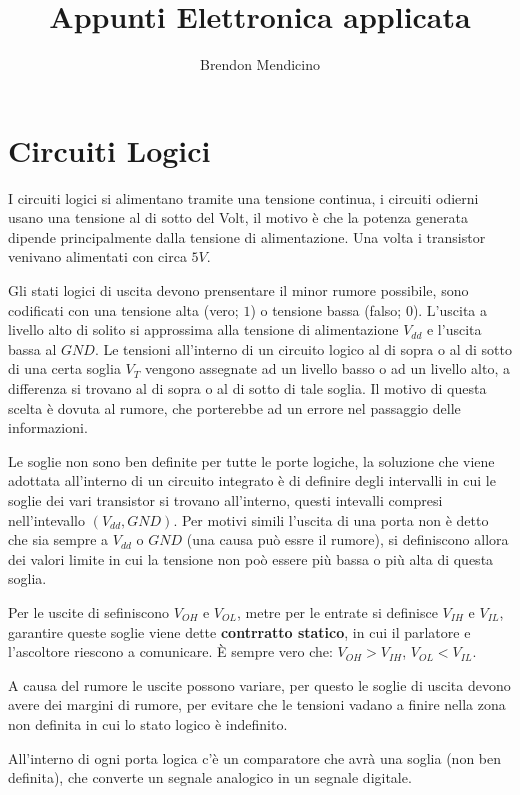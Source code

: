 \documentclass[12pt]{article}
\title{Appunti Elettronica applicata}
\author{Brendon Mendicino}
\begin{document}
\maketitle
\tableofcontents


\newpage
\section{Circuiti Logici}
I circuiti logici si alimentano tramite una tensione continua, i circuiti odierni usano una tensione al di sotto del Volt, il motivo \`e che la potenza generata dipende principalmente dalla tensione di alimentazione. Una volta i transistor venivano alimentati con circa $5V$.

Gli stati logici di uscita devono prensentare il minor rumore possibile, sono codificati con una tensione alta (vero; $1$) o tensione bassa (falso; $0$). L'uscita a livello alto di solito si approssima alla tensione di alimentazione $V_{dd}$ e l'uscita bassa al $GND$. Le tensioni all'interno di un circuito logico al di sopra o al di sotto di una certa soglia $V_T$ vengono assegnate ad un livello basso o ad un livello alto, a differenza si trovano al di sopra o al di sotto di tale soglia. Il motivo di questa scelta \`e dovuta al rumore, che porterebbe ad un errore nel passaggio delle informazioni.

Le soglie non sono ben definite per tutte le porte logiche, la soluzione che viene adottata all'interno di un circuito integrato \`e di definire degli intervalli in cui le soglie dei vari transistor si trovano all'interno, questi intevalli compresi nell'intevallo $(V_{dd}, GND)$. Per motivi simili l'uscita di una porta non \`e detto che sia sempre a $V_{dd}$ o $GND$ (una causa pu\`o essre il rumore), si definiscono allora dei valori limite in cui la tensione non po\`o essere pi\`u bassa o pi\`u alta di questa soglia.

Per le uscite di sefiniscono $V_{OH}$ e $V_{OL}$, metre per le entrate si definisce $V_{IH}$ e $V_{IL}$, garantire queste soglie viene dette \textbf{contrratto statico}, in cui il parlatore e l'ascoltore riescono a comunicare. \`E sempre vero che: $V_{OH} > V_{IH}$, $V_{OL} < V_{IL}$.
 
A causa del rumore le uscite possono variare, per questo le soglie di uscita devono avere dei margini di rumore, per evitare che le tensioni vadano a finire nella zona non definita in cui lo stato logico \`e indefinito.

All'interno di ogni porta logica c'\`e un comparatore che avr\`a una soglia (non ben definita), che converte un segnale analogico in un segnale digitale.
\end{document}
